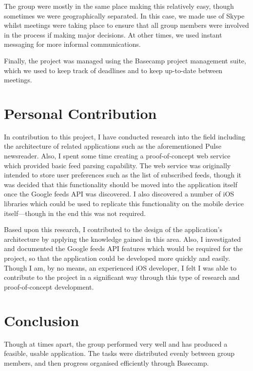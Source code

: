 \documentclass[a4paper,11pt]{article}
\begin{document}
    The group were mostly in the same place making this relatively easy, though
    sometimes we were geographically separated. In this case, we made use of
    Skype whilst meetings were taking place to ensure that all group members
    were involved in the process if making major decisions. At other times, we
    used instant messaging for more informal communications.

    Finally, the project was managed using the Basecamp project management
    suite, which we used to keep track of deadlines and to keep up-to-date
    between meetings.

    \section{Personal Contribution}

    In contribution to this project, I have conducted research into the field
    including the architecture of related applications such as the
    aforementioned Pulse newsreader. Also, I spent some time creating
    a proof-of-concept web service which provided basic feed parsing
    capability. The web service was originally intended to store user
    preferences such as the list of subscribed feeds, though it was decided
    that this functionality should be moved into the application itself once
    the Google feeds API was discovered. I also discovered a number of iOS
    libraries which could be used to replicate this functionality on the mobile
    device itself---though in the end this was not required.

    Based upon this research, I contributed to the design of the application's
    architecture by applying the knowledge gained in this area. Also,
    I investigated and documented the Google feeds API features which would be
    required for the project, so that the application could be developed more
    quickly and easily. Though I am, by no means, an experienced iOS developer,
    I felt I was able to contribute to the project in a significant way through
    this type of research and proof-of-concept development.

    \section{Conclusion}

    Though at times apart, the group performed very well and has produced
    a feasible, usable application. The tasks were distributed evenly between
    group members, and then progress organised efficiently through Basecamp.
\end{document}
